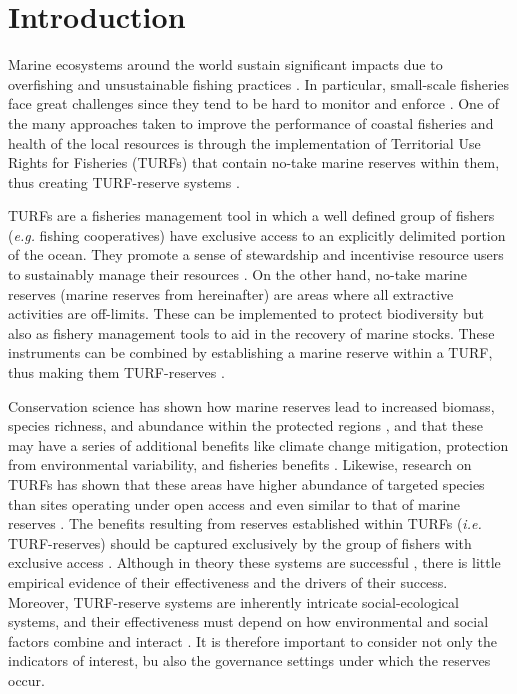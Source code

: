 \documentclass{frontiersSCNS}
\begin{document}
\hypertarget{introduction}{%
\section{Introduction}\label{introduction}}

Marine ecosystems around the world sustain significant impacts due to
overfishing and unsustainable fishing practices
\citep{pauly_2005-qV,worm_2006-IB,halpern_2008-dK}. In particular,
small-scale fisheries face great challenges since they tend to be hard
to monitor and enforce \citep{costello_2012}. One of the many approaches
taken to improve the performance of coastal fisheries and health of the
local resources is through the implementation of Territorial Use Rights
for Fisheries (TURFs) that contain no-take marine reserves within them,
thus creating TURF-reserve systems
\citep{afflerbach_2014,gelcich_2015,lester_2017}.

TURFs are a fisheries management tool in which a well defined group of
fishers (\emph{e.g.} fishing cooperatives) have exclusive access to an
explicitly delimited portion of the ocean. They promote a sense of
stewardship and incentivise resource users to sustainably manage their
resources \citep{gelcich_2008,costello_2010,mccay_2014}. On the other
hand, no-take marine reserves (marine reserves from hereinafter) are
areas where all extractive activities are off-limits. These can be
implemented to protect biodiversity but also as fishery management tools
to aid in the recovery of marine stocks. These instruments can be
combined by establishing a marine reserve within a TURF, thus making
them TURF-reserves \citep{afflerbach_2014,gelcich_2015,lester_2017}.

Conservation science has shown how marine reserves lead to increased
biomass, species richness, and abundance within the protected regions
\citep{lester_2009}, and that these may have a series of additional
benefits like climate change mitigation, protection from environmental
variability, and fisheries benefits
\citep{roberts_2017-J9,micheli_2012-EU,krueck_2017-J1}. Likewise,
research on TURFs has shown that these areas have higher abundance of
targeted species than sites operating under open access and even similar
to that of marine reserves \citep{gelcich_2008,gelcich_2012}. The
benefits resulting from reserves established within TURFs (\emph{i.e.}
TURF-reserves) should be captured exclusively by the group of fishers
with exclusive access \citep{gelcich_2015}. Although in theory these
systems are successful \citep{smallhornwest_2018}, there is little
empirical evidence of their effectiveness and the drivers of their
success. Moreover, TURF-reserve systems are inherently intricate
social-ecological systems, and their effectiveness must depend on how
environmental and social factors combine and interact
\citep{ostrom_2009,gelcich_2015}. It is therefore important to consider
not only the indicators of interest, bu also the governance settings
under which the reserves occur.
\end{document}
